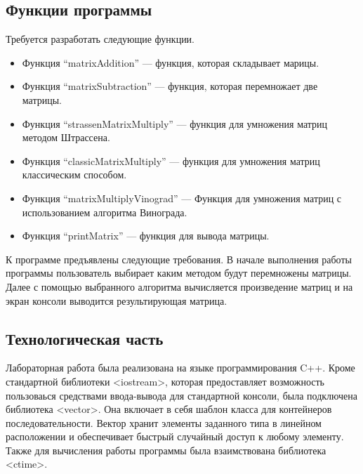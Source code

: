 \documentclass[12pt, a4paper]{article}
\begin{document}
\subsection{Функции программы}
Требуется разработать следующие функции.
\begin{itemize}
    \item[---] Функция ``matrixAddition'' --- функция, которая складывает марицы.
    \item[---] Функция ``matrixSubtraction'' --- функция, которая перемножает две матрицы.
    \item[---] Функция ``strassenMatrixMultiply'' --- функция для умножения матриц методом Штрассена.
    \item[---] Функция ``classicMatrixMultiply'' --- функция для умножения матриц классическим способом.
    \item[---] Функция ``matrixMultiplyVinograd'' ---  Функция для умножения матриц с использованием алгоритма Винограда.
    \item[---] Функция ``printMatrix'' --- функция для вывода матрицы.
\end{itemize}

К программе предъявлены следующие требования. В начале выполнения работы программы пользователь выбирает каким методом будут перемножены матрицы. Далее с помощью выбранного алгоритма вычисляется произведение матриц и на экран консоли выводится результирующая матрица.

\newpage
\begin{center}
    \section{Технологическая часть}
\end{center}

Лабораторная работа была реализована на языке программирования C++. Кроме стандартной библиотеки <iostream>, которая предоставляет возможность пользоваься средствами ввода-вывода для стандартной консоли, была подключена библиотека <vector>. Она включает в себя шаблон класса для контейнеров последовательности. Вектор хранит элементы заданного типа в линейном расположении и обеспечивает быстрый случайный доступ к любому элементу. Также для вычисления работы программы была взаимствована библиотека <ctime>.
\end{document}
